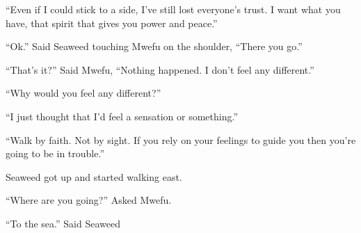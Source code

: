 ``Even if I could stick to a side, I've still lost everyone's trust. I want what you have, that spirit that gives you power and peace.''

``Ok.'' Said Seaweed touching Mwe\-fu on the shoulder, ``There you go.''

``That's it?'' Said Mwe\-fu, ``Nothing happened. I don't feel any different.''

``Why would you feel any different?''

``I just thought that I'd feel a sensation or something.''

``Walk by faith. Not by sight. If you rely on your feelings to guide you then you're going to be in trouble.''

Seaweed got up and started walking east.

``Where are you going?'' Asked Mwe\-fu.

``To the sea.'' Said Seaweed
